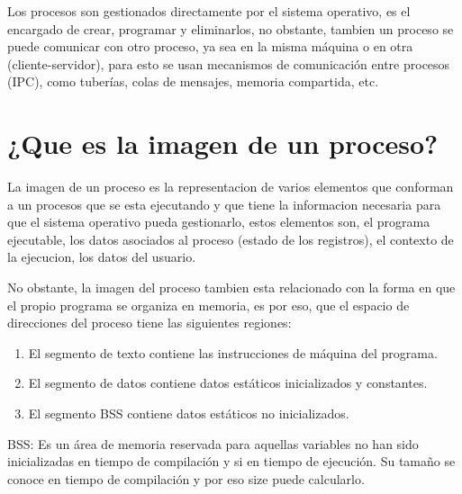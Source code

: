 \documentclass[letterpaper,11pt]{article}
\begin{document}
  Los procesos son gestionados directamente por el sistema operativo,
  es el encargado de crear, programar y eliminarlos, no obstante, tambien un proceso 
  se puede comunicar con otro proceso, ya sea 
  en la misma máquina o en otra (cliente-servidor), 
  para esto se usan mecanismos de 
  comunicación entre procesos (IPC), 
  como tuberías, colas de mensajes, memoria compartida, etc.

  \newpage

  \section{¿Que es la imagen de un proceso?}

  La imagen de un proceso es la representacion 
  de varios elementos que conforman a un procesos que se esta ejecutando y que 
  tiene la informacion necesaria para que el sistema operativo pueda gestionarlo,
  estos elementos son, el programa ejecutable,
  los datos asociados al proceso (estado de los registros), el contexto de la ejecucion, los datos del usuario. 

  No obstante, la imagen del proceso tambien esta relacionado con la forma 
  en que el propio programa se organiza en memoria, 
  es por eso, que el espacio de direcciones del proceso tiene las siguientes 
  regiones: 
  \begin{enumerate}
    \item El segmento de texto contiene las instrucciones de máquina del programa. 
    \item El segmento de datos contiene datos estáticos inicializados y constantes.
    \item El segmento BSS contiene datos estáticos no inicializados.
  \end{enumerate}

  BSS: Es un área de memoria reservada para 
  aquellas variables no han sido inicializadas en tiempo de compilación y si en tiempo de ejecución. Su tamaño se conoce en tiempo de compilación y por eso size puede calcularlo.


  \thispagestyle{empty}
  
  \nocite{*}
  \printbibliography[heading=bibintoc, title={Referencias}]
  
\end{document}
